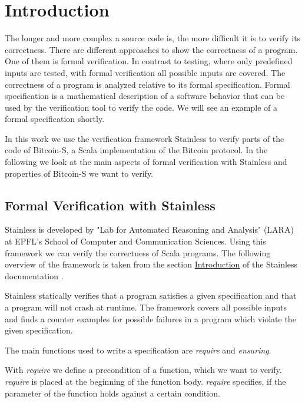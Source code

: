 \chapter{Introduction}
\label{chap:introduction}

The longer and more complex a source code is, the more difficult it is to verify its correctness.
There are different approaches to show the correctness of a program.
One of them is formal verification.
In contrast to testing, where only predefined inputs are tested, with formal verification all possible inputs are covered.
The correctness of a program is analyzed relative to its formal specification.
Formal specification is a mathematical description of a software behavior that can be used by the verification tool to verify the code.
We will see an example of a formal specification shortly.

In this work we use the verification framework Stainless to verify parts of the code of Bitcoin-S, a Scala implementation of the Bitcoin protocol.
In the following we look at the main aspects of formal verification with Stainless and properties of Bitcoin-S we want to verify.


\section{Formal Verification with Stainless}
\label{sec:stainless}

Stainless is developed by "Lab for Automated Reasoning and Analysis" (LARA) at EPFL's School of Computer and Communication Sciences.
Using this framework we can verify the correctness of Scala programs.
The following overview of the framework is taken from the section \href{https://epfl-lara.github.io/stainless/intro.html}{Introduction} of the Stainless documentation \cite{Stainless:documentation}.

Stainless statically verifies that a program satisfies a given specification and that a program will not crash at runtime.
The framework covers all possible inputs and finds a counter examples for possible failures in a program which violate the given specification.

The main functions used to write a specification are \textit{require} and \textit{ensuring}.

With \textit{require} we define a precondition of a function, which we want to verify.
\textit{require} is placed at the beginning of the function body.
\textit{require} specifies, if the parameter of the function holds against a certain condition.

